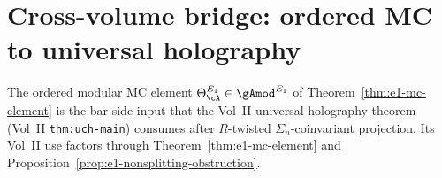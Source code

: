 
\section{Cross-volume bridge: ordered MC to universal holography}
\label{sec:e1-cross-volume-bridge}

The ordered modular MC element
$\Theta_\cA^{E_1} \in {\gAmod}^{E_1}$ of
Theorem~\ref{thm:e1-mc-element} is the bar-side input that the
Vol~II universal-holography theorem
\textup{(}Vol~II \texttt{thm:uch-main}\textup{)} consumes after
$R$-twisted $\Sigma_n$-coinvariant projection. Its Vol~II use factors
through Theorem~\ref{thm:e1-mc-element} and
Proposition~\ref{prop:e1-nonsplitting-obstruction}.

